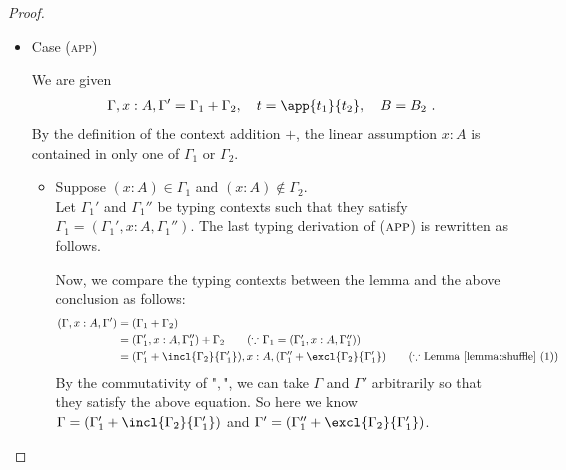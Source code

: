 \begin{proof}
\begin{itemize}
\item Case (\textsc{app})
\begin{center}
    \begin{minipage}{.75\linewidth}
    \end{minipage}
\end{center}
We are given
\begin{gather*}
\Gamma, x:A, \Gamma' = \Gamma_1 + \Gamma_2,\quad
t = \app{t_1}{t_2},\quad
B = B_2
~.
\end{gather*}
By the definition of the context addition $+$, the linear assumption $x:A$ is contained in only one of $\Gamma_1$ or $\Gamma_2$.
\begin{itemize}
\item Suppose $(x:A) \in \Gamma_1$ and $(x:A) \notin \Gamma_2$.\\
Let $\Gamma_1'$ and $\Gamma_1''$ be typing contexts such that they satisfy $\Gamma_1 = (\Gamma_1', x:A, \Gamma_1'')$.
The last typing derivation of ($\textsc{app}$) is rewritten as follows.
\begin{center}
    \begin{minipage}{.60\linewidth}
    \end{minipage}
\end{center}
Now, we compare the typing contexts between the lemma and the above conclusion as follows:
\begin{align*}
(\Gamma, x:A, \Gamma')
    &= (\Gamma_1 + \Gamma_2)\\
    &= (\Gamma_1', x:A, \Gamma_1'' ) + \Gamma_2\tag{$\because$ $\Gamma_1 = (\Gamma_1', x:A, \Gamma_1'')$}\\
    &= (\Gamma_1' + \incl{\Gamma_2}{\Gamma_1'}),x:A,(\Gamma_1'' + \excl{\Gamma_2}{\Gamma_1'})\tag{$\because$ Lemma \ref{lemma:shuffle} (1)}
\end{align*}
By the commutativity of "$,$", we can take $\Gamma$ and $\Gamma'$ arbitrarily so that they satisfy the above equation. So here we know $\Gamma = (\Gamma_1' + \incl{\Gamma_2}{\Gamma_1'})$ and $\Gamma' = (\Gamma_1'' + \excl{\Gamma_2}{\Gamma_1'})$.\par

\end{itemize}
\end{itemize}
\end{proof}
